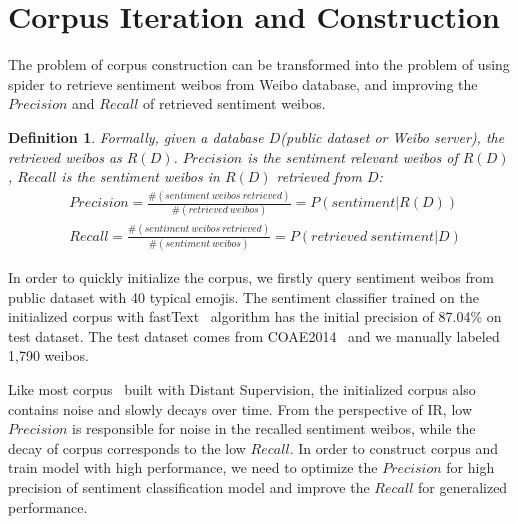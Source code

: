 \documentclass[runningheads]{llncs}
\begin{document}
\section{Corpus Iteration and Construction}
The problem of corpus construction can be transformed into the problem of using spider to retrieve sentiment weibos from Weibo database, and improving the $Precision$ and $Recall$ of retrieved sentiment weibos. 

\newtheorem{myDef}{Definition}

\begin{myDef}
Formally, given a database $D$(public dataset or Weibo server), the retrieved weibos as $R(D)$.  $Precision$ is the sentiment relevant weibos of $R(D)$, $Recall$ is the sentiment weibos in $R(D)$ retrieved from $D$:
\scriptsize{ %
\begin{align}
&Precision = \frac{\#\left ( sentiment\ weibos\ retrieved \right )}{\#\left ( retrieved\ weibos \right )} = P\left ( sentiment | R(D) \right ) \\
&Recall = \frac{\#\left ( sentiment\ weibos\ retrieved \right )}{\#\left ( sentiment\ weibos \right )} = P\left (retrieved\ sentiment | D\right )
\end{align}
} %
\end{myDef}

In order to quickly initialize the corpus, we firstly query sentiment weibos from public dataset with 40 typical emojis. The sentiment classifier trained on the initialized corpus with fastText~\cite{joulin2016bag} algorithm has the initial precision of 87.04\% on test dataset. The test dataset comes from COAE2014~\cite{Yang2015Task} and we manually labeled 1,790 weibos.

Like most corpus~\cite{go2009twitter,pak2010twitter,iosifidis2017large} built with Distant Supervision, the initialized corpus also contains noise and slowly decays over time. From the perspective of IR, low $Precision$ is responsible for noise in the recalled sentiment weibos, while the decay of corpus corresponds to the low $Recall$. In order to construct corpus and train model with high performance, we need to optimize the $Precision$ for high precision of sentiment classification model and improve the $Recall$ for generalized performance.

\end{document}
